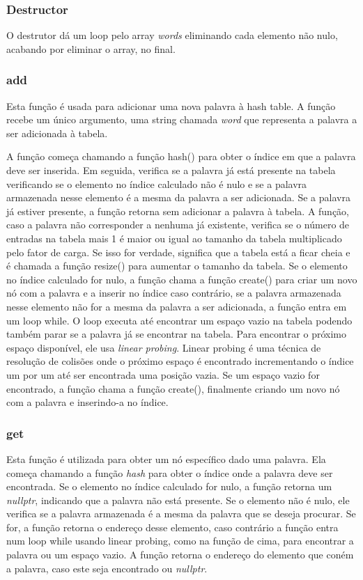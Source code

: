 \documentclass[a4paper,11pt]{article}
\begin{document}
    \subsubsection{Destructor}
O destrutor dá um loop pelo array \emph{words} eliminando cada elemento não nulo, acabando por eliminar o array, no final.
   
    \subsubsection{add}
    Esta função é usada para adicionar uma nova palavra à hash table. A função recebe um único argumento, uma string chamada \emph{word} que representa a palavra a ser adicionada à tabela.

    A função começa chamando a função hash() para obter o índice em que a palavra deve ser inserida.
    Em seguida, verifica se a palavra já está presente na tabela verificando se o elemento no índice calculado não é nulo e se a palavra armazenada nesse elemento é a mesma da palavra a ser adicionada. Se a palavra já estiver presente, a função retorna sem adicionar a palavra à tabela.
    A função, caso a palavra não corresponder a nenhuma já existente, verifica se o número de entradas na tabela mais 1 é maior ou igual ao tamanho da tabela multiplicado pelo fator de carga. Se isso for verdade, significa que a tabela está a ficar cheia e é chamada a função resize() para aumentar o tamanho da tabela.
    Se o elemento no índice calculado for nulo, a função chama a função create() para criar um novo nó com a palavra e a inserir no índice caso contrário, se a palavra armazenada nesse elemento não for a mesma da palavra a ser adicionada, a função entra em um loop while. O loop executa até encontrar um espaço vazio na tabela podendo também parar se a palavra já se encontrar na tabela. Para encontrar o próximo espaço disponível, ele usa \emph{linear probing}.
     Linear probing é uma técnica de resolução de colisões onde o próximo espaço é encontrado incrementando o índice um por um até ser encontrada uma posição vazia.
    Se um espaço vazio for encontrado, a função chama a função create(), finalmente criando um novo nó com a palavra e inserindo-a no índice.

    \subsubsection{get}
    Esta função é utilizada para obter um nó específico dado uma palavra. 
    Ela começa chamando a função \emph{hash} para obter o índice onde a palavra deve ser encontrada. Se o elemento no índice calculado for nulo, a função retorna um \emph{nullptr}, indicando que a palavra não está presente.
    Se o elemento não é nulo, ele verifica se a palavra armazenada é a mesma da palavra que se deseja procurar.
    Se for, a função retorna o endereço desse elemento, caso contrário a função entra num loop while usando linear probing, como na função de cima, para encontrar a palavra ou um espaço vazio. A função retorna o endereço do elemento que coném a palavra, caso este seja encontrado ou \emph{nullptr}.
\end{document}

